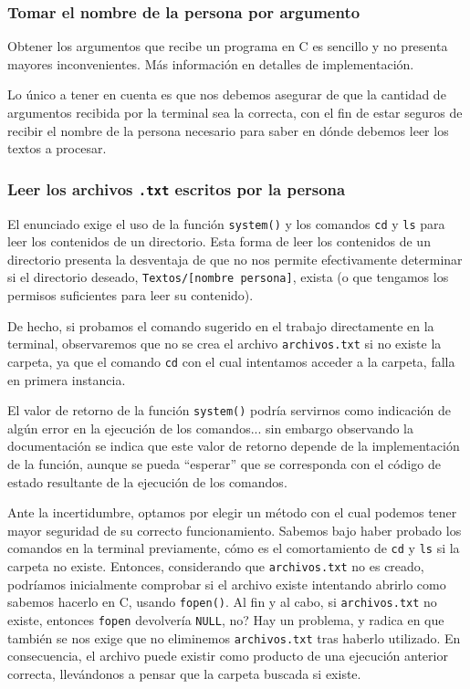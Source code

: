 \documentclass[a4paper]{article}
\begin{document}
\subsubsection{Tomar el nombre de la persona por argumento}

Obtener los argumentos que recibe un programa en C es sencillo y no presenta mayores inconvenientes. Más información en detalles de implementación. %

Lo único a tener en cuenta es que nos debemos asegurar de que la cantidad de argumentos recibida por la terminal sea la correcta, con el fin de estar seguros de recibir el nombre de la persona necesario para saber en dónde debemos leer los textos a procesar.

\subsubsection{Leer los archivos \texttt{.txt} escritos por la persona}

El enunciado exige el uso de la función \texttt{system()} y los comandos \texttt{cd} y \texttt{ls} para leer los contenidos de un directorio. Esta forma de leer los contenidos de un directorio presenta la desventaja de que no nos permite efectivamente determinar si el directorio deseado, \texttt{Textos/[nombre persona]}, exista (o que tengamos los permisos suficientes para leer su contenido).

De hecho, si probamos el comando sugerido en el trabajo directamente en la terminal, observaremos que no se crea el archivo \texttt{archivos.txt} si no existe la carpeta, ya que el comando \texttt{cd} con el cual intentamos acceder a la carpeta, falla en primera instancia.

El valor de retorno de la función \texttt{system()} podría servirnos como indicación de algún error en la ejecución de los comandos... sin embargo observando la documentación se indica que este valor de retorno depende de la implementación de la función, aunque se pueda ``esperar'' que se corresponda con el código de estado resultante de la ejecución de los comandos\cite{SystemRefC}.

Ante la incertidumbre, optamos por elegir un método con el cual podemos tener mayor seguridad de su correcto funcionamiento. Sabemos bajo haber probado los comandos en la terminal previamente, cómo es el comortamiento de \texttt{cd} y \texttt{ls} si la carpeta no existe. Entonces, considerando que \texttt{archivos.txt} no es creado, podríamos inicialmente comprobar si el archivo existe intentando abrirlo como sabemos hacerlo en C, usando \texttt{fopen()}. Al fin y al cabo, si \texttt{archivos.txt} no existe, entonces \texttt{fopen} devolvería \texttt{NULL}, no? Hay un problema, y radica en que también se nos exige que no eliminemos \texttt{archivos.txt} tras haberlo utilizado. En consecuencia, el archivo puede existir como producto de una ejecución anterior correcta, llevándonos a pensar que la carpeta buscada si existe.
\end{document}
